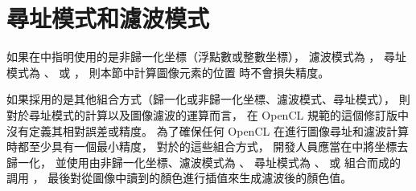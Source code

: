 \section[section:addressFilterMode]{尋址模式和濾波模式}







\startnotepar
如果在中指明使用的是非歸一化坐標（浮點數或整數坐標），
濾波模式為 ，
尋址模式為 、 
或 ，
則本節中計算圖像元素的位置  時不會損失精度。
\stopnotepar

如果採用的是其他組合方式（歸一化或非歸一化坐標、濾波模式、尋址模式），
則對於尋址模式的計算以及圖像濾波的運算而言，
在 OpenCL 規範的這個修訂版中沒有定義其相對誤差或精度。
為了確保任何 OpenCL 在進行圖像尋址和濾波計算時都至少具有一個最小精度，
對於的這些組合方式，
開發人員應當在中將坐標去歸一化，
並使用由非歸一化坐標、濾波模式為 、
尋址模式為 、 
或  組合而成的
調用 ，
最後對從圖像中讀到的顏色進行插值來生成濾波後的顏色值。
